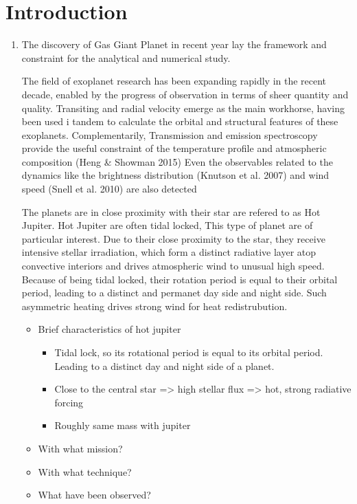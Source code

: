 \documentclass[11pt]{article}
\begin{document}
\section{Introduction}

\begin{enumerate}

\item The discovery of Gas Giant Planet in recent year lay the framework and constraint for the analytical and numerical study. 

The field of exoplanet research has been expanding rapidly in the recent decade, enabled by the progress of observation in terms of sheer quantity and quality. Transiting and radial velocity emerge as the main workhorse, having been used i tandem to calculate the orbital and structural features of these exoplanets.  Complementarily, Transmission and emission spectroscopy provide the useful constraint of the temperature profile and atmospheric composition (Heng \& Showman 2015)  Even the observables related to the dynamics like the brightness distribution (Knutson et al. 2007) and wind speed (Snell et al. 2010) are also detected 

The planets are in close proximity with their star are refered to as Hot Jupiter.  Hot Jupiter are often tidal locked, This type of planet are of particular interest. Due to their close proximity to the star, they receive intensive stellar irradiation, which form a distinct radiative layer atop convective interiors and drives atmospheric wind to unusual high speed. Because of being tidal locked, their rotation period is equal to their orbital period, leading to a distinct and permanet day side and night side. Such asymmetric heating drives strong wind for heat redistrubution. 

\begin{itemize}
\item Brief characteristics of hot jupiter
\begin{itemize}
\item Tidal lock, so its rotational period is equal to its orbital period. Leading to a distinct day and night side of a planet.
\item Close to the central star => high stellar flux => hot, strong radiative forcing 
\item Roughly same mass with jupiter
\end{itemize}
\item With what mission?
\item With what technique?
\item What have been observed?
\end{itemize}


\end{enumerate}
\end{document}
